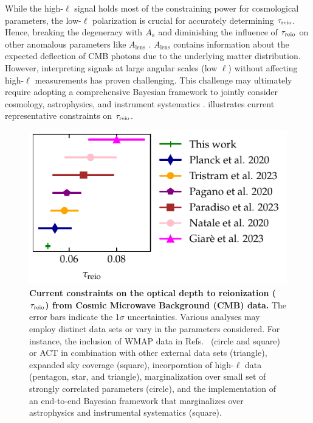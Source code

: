While the high-$\ell$ signal holds most of the constraining power for
cosmological parameters, the low-$\ell$ polarization is crucial for
accurately determining $\tau_{\mathrm{reio}}$.
Hence, breaking the degeneracy with $A_\mathrm{s}$ and diminishing the influence
of $\tau_{\mathrm{reio}}$ on other anomalous parameters like $A_\mathrm{lens}$
\cite{Giare2023}.
$A_\mathrm{lens}$ contains information about the expected deflection of
CMB photons due to the underlying matter distribution.
However, interpreting signals at large angular scales (low $\ell$)
without affecting high-$\ell$ measurements has proven challenging.
This challenge may ultimately require adopting a comprehensive Bayesian
framework to jointly consider cosmology, astrophysics, and instrument
systematics \cite{Paradiso2023}.
 illustrates current representative constraints on
$\tau_{\mathrm{reio}}$.

\begin{figure}
\centering
\includegraphics{figs/tau_fig.pdf}
\caption{\textbf{Current constraints on the optical depth to
reionization ($\tau_{\mathrm{reio}}$) from Cosmic Microwave Background (CMB)
data.}
The error bars indicate the 1$\sigma$ uncertainties.
Various analyses may employ distinct data sets or vary in the parameters
considered.
For instance, the inclusion of WMAP data in Refs.~ \cite{Natale2020,
Paradiso2023} (circle and square) or ACT in combination with other
external data sets \cite{Giare2023} (triangle), expanded sky coverage
\cite{Paradiso2023} (square), incorporation of high-$\ell$ data
\cite{Pagano2020, Planck2020a, Giare2023} (pentagon, star, and
triangle), marginalization over small set of strongly correlated
parameters \cite{Natale2020} (circle), and the implementation of an
end-to-end Bayesian framework that marginalizes over astrophysics and
instrumental systematics \cite{Paradiso2023} (square).}
\label{fig:tau}
\end{figure}

